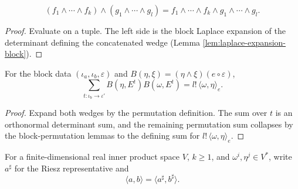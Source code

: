 \begin{lemma}
\label{lem:wedge-covectors-concat}





\[
(f_1\wedge\cdots\wedge f_k)\wedge(g_1\wedge\cdots\wedge g_l)=f_1\wedge\cdots\wedge f_k\wedge g_1\wedge\cdots\wedge g_l.
\]
\end{lemma}
\begin{proof}

\sketch Evaluate on a tuple. The left side is the block Laplace expansion of the determinant defining the concatenated wedge (Lemma \ref{lem:laplace-expansion-block}).
\end{proof}

\begin{lemma}
\label{lem:hodge-scalar-identity}





For the block data $(\iota_a,\iota_b,\varepsilon)$ and $B(\eta,\xi)=(\eta\wedge\xi)(e\circ\varepsilon)$,
\[
\sum_{t:\iota_b\to\iota'}B(\eta,E^t)B(\omega,E^t)=l!\,\langle\omega,\eta\rangle_e.
\]
\end{lemma}
\begin{proof}

\sketch Expand both wedges by the permutation definition. The sum over $t$ is an orthonormal determinant sum, and the remaining permutation sum collapses by the block-permutation lemmas to the defining sum for $l!\,\langle\omega,\eta\rangle_e$.
\end{proof}

For a finite-dimensional real inner product space $V$, $k\ge1$, and $\omega^i,\eta^j\in V^*$, write $a^\sharp$ for the Riesz representative and
\begin{equation}
\langle a,b\rangle=\langle a^\sharp,b^\sharp\rangle. \tag{2.26a}
\end{equation}

